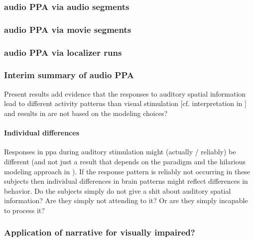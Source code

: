 \subsubsection{audio PPA via audio segments}

\subsubsection{audio PPA via movie segments}

\subsubsection{audio PPA via localizer runs}

\subsubsection{Interim summary of audio PPA}


%
Present results add evidence that the responses to auditory spatial information
lead to different activity patterns than visual stimulation [cf. interpretation
in \citet{haeusler2022processing}] and results in \citet{haeusler2022processing}
are not based on the modeling choices?



\paragraph{Individual differences}


%
Responses in \ac{ppa} during auditory stimulation might (actually / reliably) be
different (and not just a result that depends on the paradigm and the hilarious
modeling approach in \citet{haeusler2022processing}).
%
If the response pattern is reliably not occurring in these subjects then
individual differences in brain patterns might reflect differences in behavior.
%
Do the subjects simply do not give a shit about auditory spatial information?
%
Are they simply not attending to it? Or are they simply incapable to process it?


\subsubsection{Application of narrative for visually impaired?}

